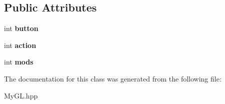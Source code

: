 \subsection*{Public Attributes}
\begin{DoxyCompactItemize}
\item 
int {\bfseries button}\hypertarget{classMouseButton_ada6d6e1d81eaedf7092a8617af6ede6b}{}\label{classMouseButton_ada6d6e1d81eaedf7092a8617af6ede6b}

\item 
int {\bfseries action}\hypertarget{classMouseButton_a7f22ddcecc4bfe282f7c8b150e28704b}{}\label{classMouseButton_a7f22ddcecc4bfe282f7c8b150e28704b}

\item 
int {\bfseries mods}\hypertarget{classMouseButton_a1fa333819593583ccc090db9330018ad}{}\label{classMouseButton_a1fa333819593583ccc090db9330018ad}

\end{DoxyCompactItemize}


The documentation for this class was generated from the following file\+:\begin{DoxyCompactItemize}
\item 
My\+G\+L.\+hpp\end{DoxyCompactItemize}
